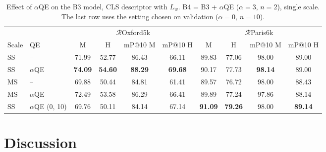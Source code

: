 \documentclass[runningheads]{llncs}
\newcommand{\roxf}{$\mathcal{R}$Oxford5k}
\newcommand{\rpar}{$\mathcal{R}$Paris6k}
\newcommand{\aqe}{$\alpha$QE}
\newcommand{\best}[1]{\textbf{#1}}
\begin{document}
\begin{table}[t]
\centering
\caption{Effect of \aqe{} on the B3 model, CLS descriptor with $L_w$.
B4 = B3 + \aqe{} ($\alpha=3$, $n=2$), single scale. The last row uses the
setting chosen on validation ($\alpha=0$, $n=10$).}
\label{tab:qe}
\setlength{\tabcolsep}{3.5pt}
\begin{adjustbox}{max width=\textwidth}
\begin{tabular}{@{}llcccccccc@{}}
\toprule
 & & \multicolumn{4}{c}{\roxf} & \multicolumn{4}{c}{\rpar}\\
\cmidrule(lr){3-6}\cmidrule(lr){7-10}
Scale & QE & M & H & mP@10 M & mP@10 H & M & H & mP@10 M & mP@10 H\\
\midrule
SS & --    & 71.99 & 52.77 & 86.43 & 66.11 & 89.83 & 77.06 & 98.00 & 89.00\\
SS & \aqe  & \best{74.09} & \best{54.60} & \best{88.29} & \best{69.68} & 90.17 & 77.73 & \best{98.14} & 89.00\\
MS & --    & 69.88 & 50.44 & 84.81 & 61.41 & 89.57 & 76.72 & 98.00 & 88.43\\
MS & \aqe  & 72.49 & 53.58 & 86.29 & 66.41 & 89.89 & 77.24 & 97.86 & 88.14\\
\midrule
SS & \aqe{} (0, 10) & 69.76 & 50.11 & 84.14 & 67.14 & \best{91.09} & \best{79.26} & 98.00 & \best{89.14}\\
\bottomrule
\end{tabular}
\end{adjustbox}
\end{table}

\section{Discussion}
\label{sec:discussion}
\end{document}
